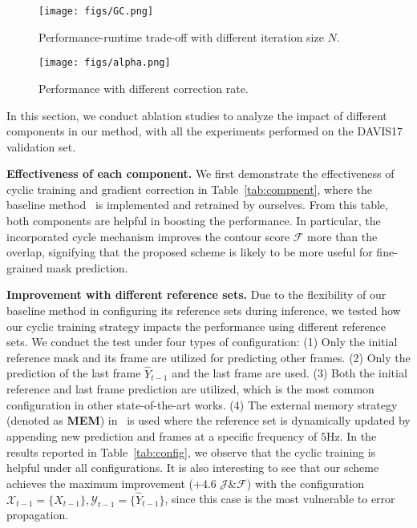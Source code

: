\documentclass{article}
\begin{document}
\begin{figure}[t]
\vspace{-8mm}

    \begin{minipage}{0.5\linewidth}
        \texttt{[image: figs/GC.png]}
    \caption{Performance-runtime trade-off with different iteration size $N$.}
    \label{fig:runtime}
    \end{minipage}
    \noindent
    \hspace{2mm}
    \begin{minipage}{0.45\linewidth}
        \texttt{[image: figs/alpha.png]}
    \caption{Performance with different correction rate.}
    \label{fig:alpha}
    \end{minipage}

\vspace{-5mm}
\end{figure}

In this section, we conduct ablation studies to analyze the impact of different components in our method, with all the experiments performed on the DAVIS17 validation set.

\textbf{Effectiveness of each component.} We first demonstrate the effectiveness of cyclic training and gradient correction in Table~\ref{tab:compnent}, where the baseline method~\cite{Oh_2019_ICCV} is implemented and retrained by ourselves. From this table, both components are helpful in boosting the performance. In particular, the incorporated cycle mechanism improves the contour score $\mathcal{F}$ more than the overlap, signifying that the proposed scheme is likely to be more useful for fine-grained mask prediction.

\textbf{Improvement with different reference sets.} Due to the flexibility of our baseline method in configuring its reference sets during inference, we tested how our cyclic training strategy impacts the performance using different reference sets. We conduct the test under four types of configuration: (1) Only the initial reference mask and its frame are utilized for predicting other frames. (2) Only the prediction of the last frame $\widehat{Y}_{t-1}$ and the last frame are used. (3) Both the initial reference and last frame prediction are utilized, which is the most common configuration in other state-of-the-art works. (4) The external memory strategy (denoted as \textbf{MEM}) in~\cite{Oh_2019_ICCV} is used where the reference set is dynamically updated by appending new prediction and frames at a specific frequency of $5$Hz. In the results reported in Table~\ref{tab:config}, we observe that the cyclic training is helpful under all configurations. It is also interesting to see that our scheme achieves the maximum improvement (+4.6 $\mathcal{J}\&\mathcal{F}$) with the configuration $\mathcal{X}_{t-1}=\{X_{t-1}\}, \mathcal{Y}_{t-1}=\{\widehat{Y}_{t-1}\}$, since this case is the most vulnerable to error propagation.
\end{document}
